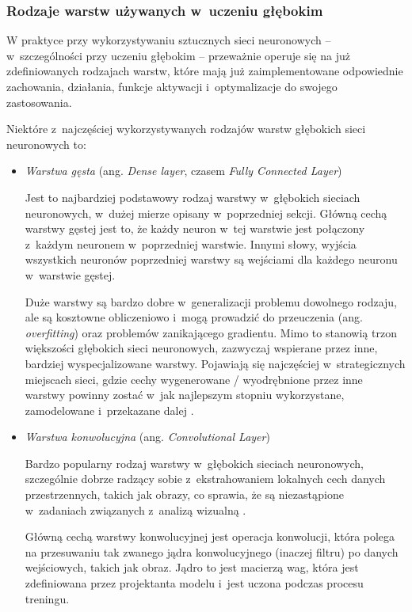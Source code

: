 \subsubsection{Rodzaje warstw używanych w~uczeniu głębokim}
\label{sec:deep-learning-layers}

W praktyce przy wykorzystywaniu sztucznych sieci neuronowych -- w~szczególności przy uczeniu głębokim -- przeważnie operuje się na już zdefiniowanych rodzajach warstw, które mają już zaimplementowane odpowiednie zachowania, działania, funkcje aktywacji i~optymalizacje do swojego zastosowania.

Niektóre z~najczęściej wykorzystywanych rodzajów warstw głębokich sieci neuronowych to:

\begin{itemize}

  \item \emph{Warstwa gęsta} (ang. \emph{Dense layer}, czasem \emph{Fully Connected Layer})

        Jest to najbardziej podstawowy rodzaj warstwy w~głębokich sieciach neuronowych, w~dużej mierze opisany w~poprzedniej sekcji.
        Główną cechą warstwy gęstej jest to, że każdy neuron w~tej warstwie jest połączony z~każdym neuronem w~poprzedniej warstwie.
        Innymi słowy, wyjścia wszystkich neuronów poprzedniej warstwy są wejściami dla każdego neuronu w~warstwie gęstej.

        Duże warstwy są bardzo dobre w~generalizacji problemu dowolnego rodzaju, ale są kosztowne obliczeniowo i~mogą prowadzić do przeuczenia (ang. \emph{overfitting}) oraz problemów
        zanikającego gradientu.
        Mimo to stanowią trzon większości głębokich sieci neuronowych, zazwyczaj wspierane przez inne, bardziej wyspecjalizowane warstwy.
        Pojawiają się najczęściej w~strategicznych miejscach sieci, gdzie cechy wygenerowane / wyodrębnione przez inne warstwy powinny zostać w~jak najlepszym stopniu wykorzystane, zamodelowane i~przekazane dalej \cite{josephine2021impact}.

  \item \emph{Warstwa konwolucyjna} (ang. \emph{Convolutional Layer})

        Bardzo popularny rodzaj warstwy w~głębokich sieciach neuronowych, szczególnie dobrze radzący sobie z~ekstrahowaniem lokalnych cech danych przestrzennych, takich jak obrazy, co sprawia, że są niezastąpione w~zadaniach związanych z~analizą wizualną \cite{albawi2017understanding}.

        Główną cechą warstwy konwolucyjnej jest operacja konwolucji, która polega na przesuwaniu tak zwanego jądra konwolucyjnego (inaczej filtru) po danych wejściowych, takich jak obraz.
        Jądro to jest macierzą wag, która jest zdefiniowana przez projektanta modelu i~jest uczona podczas procesu treningu.


\end{itemize}
